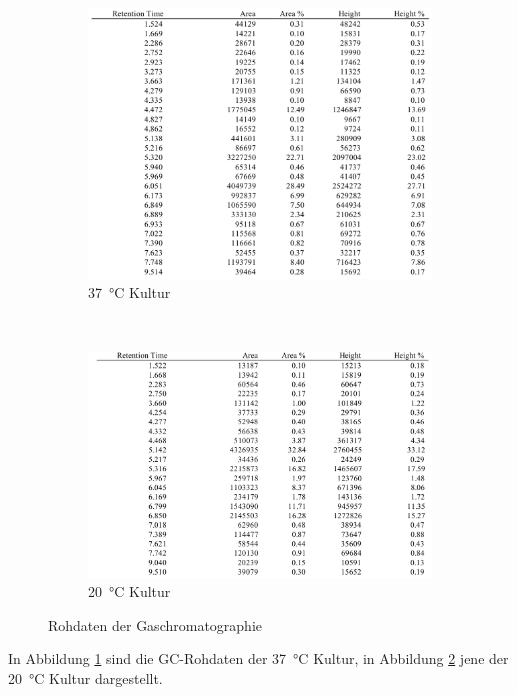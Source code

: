 \documentclass[a4paper,english]{scrreprt}
\begin{document}
\begin{figure}
	\centering
	\begin{subfigure}{.45\textwidth}
		\includegraphics[width=\linewidth]{img/gc_37_roh.png}
		\caption{\SI{37}{\celsius} Kultur}
		\label{fig:gc_37_roh}
	\end{subfigure}
	~
	\begin{subfigure}{.45\textwidth}
		\includegraphics[width=\linewidth]{img/gc_20_roh.png}
		\caption{\SI{20}{\celsius} Kultur}
		\label{fig:gc_20_roh}
	\end{subfigure}
	\label{fig:gc_roh}
	\caption{Rohdaten der Gaschromatographie}
\end{figure}


In Abbildung \ref{fig:gc_37_roh} sind die GC-Rohdaten der \SI{37}{\celsius}
Kultur, in Abbildung \ref{fig:gc_20_roh} jene der \SI{20}{\celsius} Kultur
dargestellt.
\end{document}

